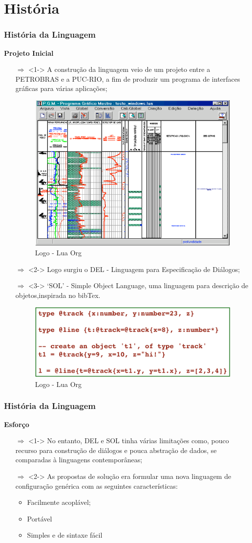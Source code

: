 \documentclass{beamer}
\begin{document}
\section{História}
\begin{frame}[fragile]
\frametitle{História da Linguagem}
	{\bf Projeto Inicial}\vspace{0.2cm}
	\begin{itemize}
		\item[$\Rightarrow$]<1-> A construção da linguagem veio de um projeto entre a PETROBRAS e a PUC-RIO, a fim de produzir um programa de interfaces gráficas para várias aplicações;
		\begin{figure}[!htb]
			\centering
			\includegraphics[width=0.3\linewidth]{imagens/imagem1}
			\caption{Logo - Lua Org}
		\end{figure}
		\item[$\Rightarrow$]<2-> Logo surgiu o DEL - Linguagem para Especificação de Diálogos;
		\item[$\Rightarrow$]<3-> ‘SOL’ - Simple Object Language, uma linguagem para descrição de objetos,inspirada no bibTex.
		\begin{figure}[!htb]
			\centering
			\includegraphics[width=0.3\linewidth]{imagens/imagem2}
			\caption{Logo - Lua Org}
		\end{figure}
	\end{itemize}
\end{frame}

\begin{frame}[fragile]
\frametitle{História da Linguagem}
	{\bf Esforço}\vspace{0.2cm}
	\begin{itemize}
		\item[$\Rightarrow$]<1-> No entanto, DEL e SOL tinha várias limitações como, pouco recurso para construção de diálogos e pouca abstração de dados, se comparadas à linguagens contemporâneas;
		\item[$\Rightarrow$]<2-> As propostas de solução era formular uma nova linguagem de configuração genérica com as seguintes características:
		\begin{itemize}
			\item<3-> Facilmente acoplável;
			\item<4-> Portável
			\item<5-> Simples e de sintaxe fácil
		\end{itemize}
	\end{itemize}
\end{frame}
\end{document}
